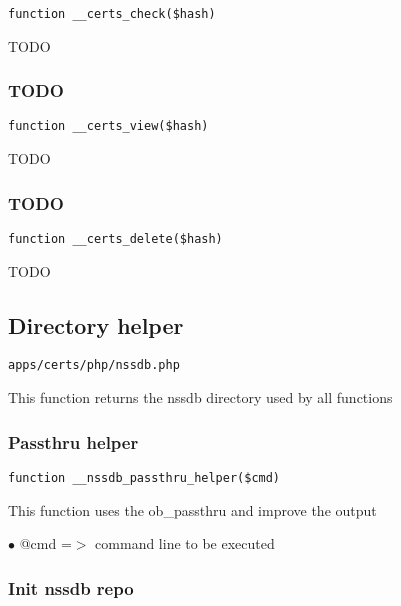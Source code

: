 \documentclass[a4paper]{article}
\begin{document}
\begin{lstlisting}
function __certs_check($hash)
\end{lstlisting}

TODO

\hypertarget{toc7}{}
\subsubsection{TODO}

\begin{lstlisting}
function __certs_view($hash)
\end{lstlisting}

TODO

\hypertarget{toc8}{}
\subsubsection{TODO}

\begin{lstlisting}
function __certs_delete($hash)
\end{lstlisting}

TODO

\hypertarget{toc9}{}
\subsection{Directory helper}

\begin{lstlisting}
apps/certs/php/nssdb.php
\end{lstlisting}

This function returns the nssdb directory used by all functions

\hypertarget{toc10}{}
\subsubsection{Passthru helper}

\begin{lstlisting}
function __nssdb_passthru_helper($cmd)
\end{lstlisting}

This function uses the ob\_passthru and improve the output

\begin{compactitem}
\item[\color{myblue}$\bullet$] @cmd =$>$ command line to be executed
\end{compactitem}

\hypertarget{toc11}{}
\subsubsection{Init nssdb repo}
\end{document}

